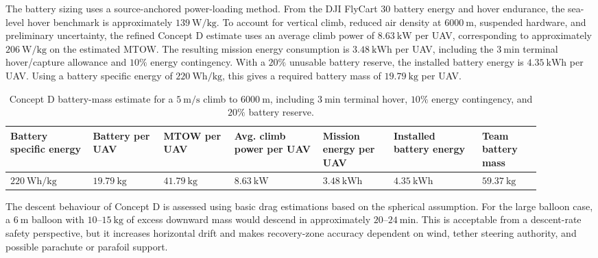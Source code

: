 The battery sizing uses a source-anchored power-loading method. From the DJI FlyCart 30 battery energy and hover endurance, the sea-level hover benchmark is approximately \(139~\mathrm{W/kg}\). To account for vertical climb, reduced air density at \(6000~\mathrm{m}\), suspended hardware, and preliminary uncertainty, the refined Concept D estimate uses an average climb power of \(8.63~\mathrm{kW}\) per UAV, corresponding to approximately \(206~\mathrm{W/kg}\) on the estimated MTOW. The resulting mission energy consumption is \(3.48~\mathrm{kWh}\) per UAV, including the \(3~\mathrm{min}\) terminal hover/capture allowance and \(10\%\) energy contingency. With a \(20\%\) unusable battery reserve, the installed battery energy is \(4.35~\mathrm{kWh}\) per UAV. Using a battery specific energy of \(220~\mathrm{Wh/kg}\), this gives a required battery mass of \(19.79~\mathrm{kg}\) per UAV.


\begin{table}[H]
\centering
\small
\caption{Concept D battery-mass estimate for a $5~\mathrm{m/s}$ climb to $6000~\mathrm{m}$, including $3~\mathrm{min}$ terminal hover, $10\%$ energy contingency, and $20\%$ battery reserve.}
\label{tab:conceptD_battery_mass_estimate}
\setlength{\tabcolsep}{3pt} %
\renewcommand{\arraystretch}{1.3}
\begin{tabular}{
    >{\centering\arraybackslash}p{0.14\linewidth}
    >{\centering\arraybackslash}p{0.12\linewidth}
    >{\centering\arraybackslash}p{0.12\linewidth}
    >{\centering\arraybackslash}p{0.15\linewidth}
    >{\centering\arraybackslash}p{0.12\linewidth}
    >{\centering\arraybackslash}p{0.15\linewidth}
    >{\centering\arraybackslash}p{0.10\linewidth}
}
\toprule
\textbf{Battery specific energy} & 
\textbf{Battery per UAV} & 
\textbf{MTOW per UAV} & 
\textbf{Avg. climb power per UAV} & 
\textbf{Mission energy per UAV} & 
\textbf{Installed battery energy} & 
\textbf{Team battery mass} \\
\midrule
$220~\mathrm{Wh/kg}$ & $19.79~\mathrm{kg}$ & $41.79~\mathrm{kg}$ & $8.63~\mathrm{kW}$ & $3.48~\mathrm{kWh}$ & $4.35~\mathrm{kWh}$ & $59.37~\mathrm{kg}$ \\
\bottomrule
\end{tabular}
\end{table}




The descent behaviour of Concept D is assessed using basic drag estimations based on the spherical assumption. For the large balloon case, a \(6~\mathrm{m}\) balloon with \(10\)--\(15~\mathrm{kg}\) of excess downward mass would descend in approximately \(20\)--\(24~\mathrm{min}\). This is acceptable from a descent-rate safety perspective, but it increases horizontal drift and makes recovery-zone accuracy dependent on wind, tether steering authority, and possible parachute or parafoil support.

